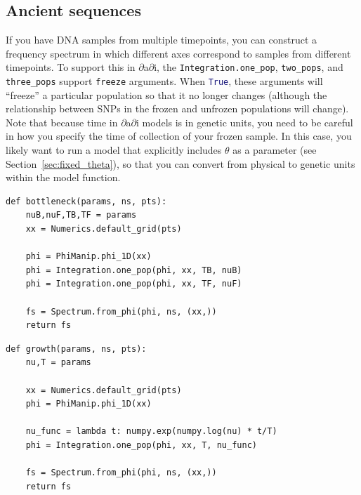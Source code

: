 \documentclass[12pt]{article}
\makeatletter
\newcommand{\dadi}{$\partial$a$\partial$i\xspace}
\newcommand{\py}[1]{\lstinline[language=Python, showstringspaces=False]@#1@}
\makeatother
\begin{document}
\subsection{Ancient sequences}\label{sec:ancient_sequences}

If you have DNA samples from multiple timepoints, you can construct a frequency spectrum in which different axes correspond to samples from different timepoints.
To support this in \dadi, the \py{Integration.one_pop}, \py{two_pops}, and \py{three_pops} support \py{freeze} arguments.
When \py{True}, these arguments will ``freeze'' a particular population so that it no longer changes (although the relationship between SNPs in the frozen and unfrozen populations will change).
Note that because time in \dadi models is in genetic units, you need to be careful in how you specify the time of collection of your frozen sample.
In this case, you likely want to run a model that explicitly includes $\theta$ as a parameter (see Section~\ref{sec:fixed_theta}), so that you can convert from physical to genetic units within the model function.

\clearpage

\begin{lstlisting}[caption={\textbf{Bottleneck:} At time \py{TF} + \py{TB} in the past, an equilibrium population goes through a bottleneck of depth \py{nuB}, recovering to relative size \py{nuF}.}, float, label={lst:bottleneck}]
def bottleneck(params, ns, pts):
    nuB,nuF,TB,TF = params
    xx = Numerics.default_grid(pts)
    
    phi = PhiManip.phi_1D(xx)
    phi = Integration.one_pop(phi, xx, TB, nuB)
    phi = Integration.one_pop(phi, xx, TF, nuF)

    fs = Spectrum.from_phi(phi, ns, (xx,))
    return fs
\end{lstlisting}

\begin{lstlisting}[caption={\textbf{Exponential growth:} At time \py{T} in the past, an equilibrium population begins growing exponentially, reaching size \py{nu} at present.}, float]
def growth(params, ns, pts):
    nu,T = params

    xx = Numerics.default_grid(pts)
    phi = PhiManip.phi_1D(xx)

    nu_func = lambda t: numpy.exp(numpy.log(nu) * t/T)
    phi = Integration.one_pop(phi, xx, T, nu_func)

    fs = Spectrum.from_phi(phi, ns, (xx,))
    return fs
\end{lstlisting}
\end{document}
